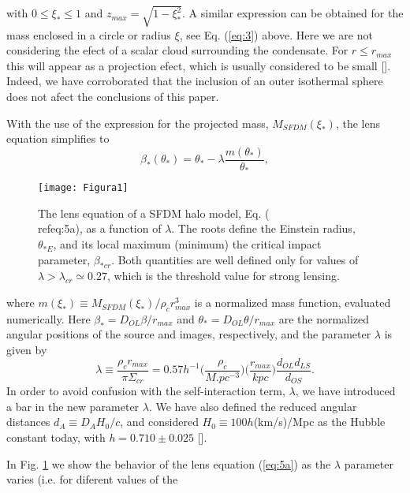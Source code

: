 \documentclass{article}
\begin{document}
\begin{multicols}{2}
\begin{equation}
\end{equation}
with $0\leq \xi_*\leq1$ and $z_{max}=\sqrt{1-\xi^2_*}$. A similar
expression can be obtained for the mass enclosed in a
circle or radius $\xi$, see Eq. (\ref{eq:3}) above. Here we are not
considering the efect of a scalar cloud surrounding the
condensate. For $r\leq r_{max}$ this will appear as a projection
efect, which is usually considered to be small [\cite{13}]. Indeed,
we have corroborated that the inclusion of an outer
isothermal sphere does not afect the conclusions of this
paper.\par
With the use of the expression for the projected mass,
$M_{SFDM}(\xi_*)$, the lens equation simplifies to
\begin{equation} \label{eq:5a}
\beta_*(\theta_*)=\theta_*-\lambda \frac{m(\theta_*)}{\theta_*},
\end{equation}
\begin{figure}
\graphicspath{{E:/Escuela/DCI Física/Herramientas Informáticas y Gestión de la Información}}
\texttt{[image: Figura1]}
\caption{The lens equation of a SFDM halo model, Eq. (\\ref{eq:5a}), as
a function of $\lambda$. The roots define the Einstein radius, $\theta_{*E}$, and
its local maximum (minimum) the critical impact parameter, 
$\beta_{*cr}$. Both quantities are well defined only for values of $\lambda>\lambda_{cr}\simeq 0.27$, 
which is the threshold value for strong lensing.}
\label{fig:figura1}
\end{figure}
where $m(\xi_*)\equiv M_{SFDM}(\xi_*)/\rho_cr^3_{max}$ is a normalized mass
function, evaluated numerically. Here $\beta_*=D_{OL}\beta/r_{max}$ 
and $\theta_*=D_{OL}\theta/r_{max}$ are the normalized angular positions
of the source and images, respectively, and the parameter $\lambda$ is given by
\begin{equation} \label{eq:5b}
\lambda \equiv \frac{\rho_cr_{max}}{\pi \Sigma_{cr}}=0.57h^{-1}\bigg(\frac{\rho_c}{M.pc^{-3}}\bigg)\bigg(\frac{r_{max}}{kpc}\bigg)\frac{d_{OL}d_{LS}}{d_{OS}}.
\end{equation}
In order to avoid confusion with the self-interaction term, 
$\lambda$, we have introduced a bar in the new parameter $\lambda$. We
have also defined the reduced angular distances $d_A\equiv D_AH_0/c$, and 
considered $H_0\equiv 100h$(km/s)/Mpc as the
Hubble constant today, with $h=0.710\pm0.025$ [\cite{14}].\par
In Fig. \ref{fig:figura1} we show the behavior of the lens equation (\ref{eq:5a})
as the $\lambda$ parameter varies (i.e. for diferent values of the

\end{multicols}
\end{document}

